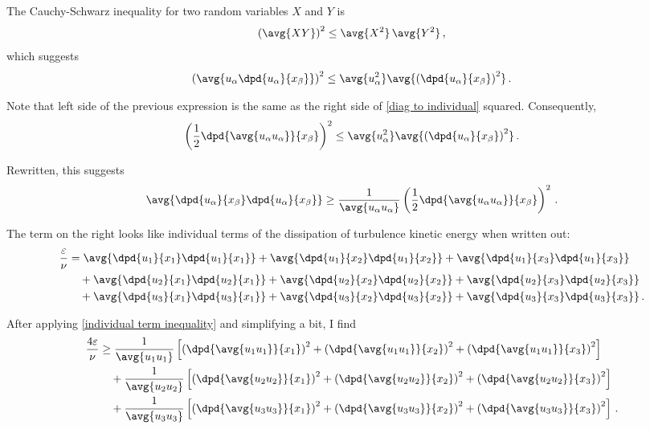 \documentclass[ccbysa,note]{bmtreport}
\begin{document}
The Cauchy-Schwarz inequality for two random variables $X$ and $Y$ is
\begin{equation}
   \left(\avg{X Y}\right)^2 \leq \avg{X^2} \, \avg{Y^2} \,,
\end{equation}
which suggests
\begin{equation}
   \left(\avg{u_\alpha \dpd{u_\alpha}{x_\beta}}\right)^2 \leq \avg{u_\alpha^2} \avg{\left(\dpd{u_\alpha}{x_\beta}\right)^2} \,.
\end{equation}

Note that left side of the previous expression is the same as the right side of \eqref{diag to individual} squared. Consequently,
\begin{equation}
   \left(\frac{1}{2} \dpd{\avg{u_\alpha u_\alpha}}{x_\beta}\right)^2 \leq \avg{u_\alpha^2} \avg{\left(\dpd{u_\alpha}{x_\beta}\right)^2} \,.
\end{equation}

Rewritten, this suggests
\begin{equation}
   \avg{\dpd{u_\alpha}{x_\beta} \dpd{u_\alpha}{x_\beta}} \geq \frac{1}{\avg{u_\alpha u_\alpha}} \left(\frac{1}{2} \dpd{\avg{u_\alpha u_\alpha}}{x_\beta}\right)^2 \,. \label{eq:individual term inequality}
\end{equation}

The term on the right looks like individual terms of the dissipation of turbulence kinetic energy when written out:
\begin{align}
   \frac{\varepsilon}{\nu} &= \avg{\dpd{u_1}{x_1} \dpd{u_1}{x_1}} + \avg{\dpd{u_1}{x_2} \dpd{u_1}{x_2}} + \avg{\dpd{u_1}{x_3} \dpd{u_1}{x_3}} \notag \\
                           &\quad + \avg{\dpd{u_2}{x_1} \dpd{u_2}{x_1}} + \avg{\dpd{u_2}{x_2} \dpd{u_2}{x_2}} + \avg{\dpd{u_2}{x_3} \dpd{u_2}{x_3}} \notag \\
                           &\quad + \avg{\dpd{u_3}{x_1} \dpd{u_3}{x_1}} + \avg{\dpd{u_3}{x_2} \dpd{u_3}{x_2}} + \avg{\dpd{u_3}{x_3} \dpd{u_3}{x_3}} \,.
\end{align}

After applying \eqref{individual term inequality} and simplifying a bit, I find
\begin{align}
   \frac{4 \varepsilon}{\nu} &\geq \frac{1}{\avg{u_1 u_1}} \left[\left(\dpd{\avg{u_1 u_1}}{x_1}\right)^2 + \left(\dpd{\avg{u_1 u_1}}{x_2}\right)^2 + \left(\dpd{\avg{u_1 u_1}}{x_3}\right)^2\right] \notag \\
                             &\quad + \frac{1}{\avg{u_2 u_2}} \left[\left(\dpd{\avg{u_2 u_2}}{x_1}\right)^2 + \left(\dpd{\avg{u_2 u_2}}{x_2}\right)^2 + \left(\dpd{\avg{u_2 u_2}}{x_3}\right)^2\right] \notag \\
                             &\quad + \frac{1}{\avg{u_3 u_3}} \left[\left(\dpd{\avg{u_3 u_3}}{x_1}\right)^2 + \left(\dpd{\avg{u_3 u_3}}{x_2}\right)^2 + \left(\dpd{\avg{u_3 u_3}}{x_3}\right)^2\right] \,. \label{eq:diagonal reynolds stress inequality}
\end{align}
\end{document}
